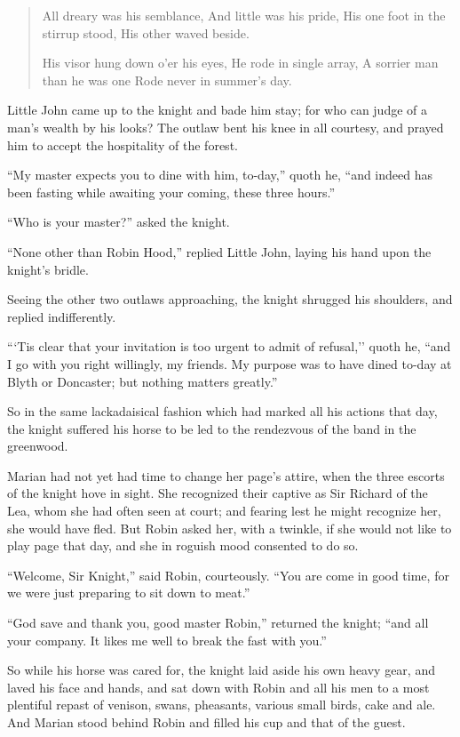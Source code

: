 \begin{quote}
All dreary was his semblance,
And little was his pride,
His one
foot in the stirrup stood,
His other waved beside.

His visor hung down o’er his eyes,
He rode in single array,
A sorrier man than he was one
Rode never in summer’s day.
\end{quote}

Little John came up to the knight and bade him stay; for who can judge
of a man's wealth by his looks? The outlaw bent his knee in all
courtesy, and prayed him to accept the hospitality of the forest.

``My master expects you to dine with him, to-day,'' quoth he, ``and
indeed has been fasting while awaiting your coming, these three hours.''

``Who is your master?'' asked the knight.

``None other than Robin Hood,'' replied Little John, laying his hand
upon the knight's bridle.

Seeing the other two outlaws approaching, the knight shrugged his
shoulders, and replied indifferently.

```Tis clear that your invitation is too urgent to admit of refusal,''
quoth he, ``and I go with you right willingly, my friends. My purpose
was to have dined to-day at Blyth or Doncaster; but nothing matters
greatly.''

So in the same lackadaisical fashion which had marked all his actions
that day, the knight suffered his horse to be led to the rendezvous of
the band in the greenwood.

Marian had not yet had time to change her page's attire, when the three
escorts of the knight hove in sight. She recognized their captive as Sir
Richard of the Lea, whom she had often seen at court; and fearing lest
he might recognize her, she would have fled. But Robin asked her, with a
twinkle, if she would not like to play page that day, and she in roguish
mood consented to do so.

``Welcome, Sir Knight,'' said Robin, courteously. ``You are come in good
time, for we were just preparing to sit down to meat.''

``God save and thank you, good master Robin,'' returned the knight;
``and all your company. It likes me well to break the fast with you.''

So while his horse was cared for, the knight laid aside his own heavy
gear, and laved his face and hands, and sat down with Robin and all his
men to a most plentiful repast of venison, swans, pheasants, various
small birds, cake and ale. And Marian stood behind Robin and filled his
cup and that of the guest.

